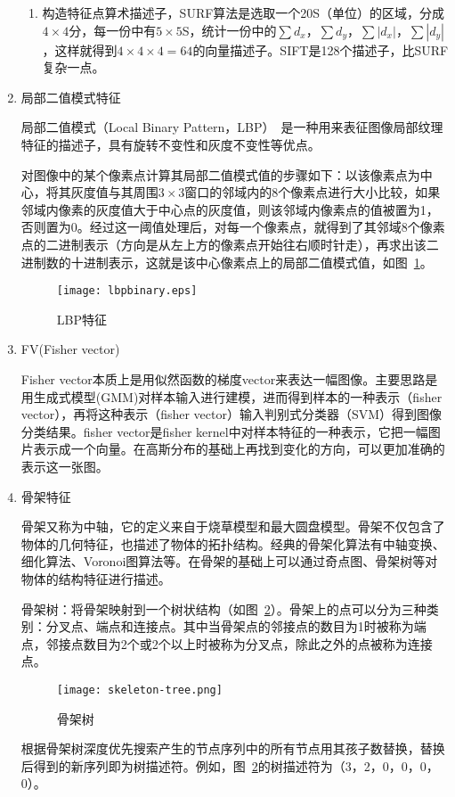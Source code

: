 \begin{enumerate}
\begin{enumerate}
\item 构造特征点算术描述子，SURF算法是选取一个20S（单位）的区域，分成$4 \times 4$分，每一份中有$5 \times 5$S，统计一份中的$\sum d_{x}$，$\sum d_{y}$，$\sum |d_{x}|$，$\sum |d_{y}|$，这样就得到$4 \times 4 \times 4 = 64$的向量描述子。SIFT是128个描述子，比SURF复杂一点。
\end{enumerate}

\item 局部二值模式特征

局部二值模式（Local Binary Pattern，LBP）~\cite{ojala1994performance}是一种用来表征图像局部纹理特征的描述子，具有旋转不变性和灰度不变性等优点。
 
 对图像中的某个像素点计算其局部二值模式值的步骤如下：以该像素点为中心，将其灰度值与其周围$3\times3$窗口的邻域内的8个像素点进行大小比较，如果邻域内像素的灰度值大于中心点的灰度值，则该邻域内像素点的值被置为1，否则置为0。经过这一阈值处理后，对每一个像素点，就得到了其邻域8个像素点的二进制表示（方向是从左上方的像素点开始往右顺时针走），再求出该二进制数的十进制表示，这就是该中心像素点上的局部二值模式值，如图~\ref{fig: lbp}。
\begin{figure}[!ht]
\centering
\texttt{[image: lbpbinary.eps]}
\caption{LBP特征}
\label{fig: lbp}
\end{figure}

\item FV(Fisher vector)
   
Fisher vector本质上是用似然函数的梯度vector来表达一幅图像。主要思路是用生成式模型(GMM)对样本输入进行建模，进而得到样本的一种表示（fisher vector），再将这种表示（fisher vector）输入判别式分类器（SVM）得到图像分类结果。fisher vector是fisher kernel中对样本特征的一种表示，它把一幅图片表示成一个向量。在高斯分布的基础上再找到变化的方向，可以更加准确的表示这一张图。

\item 骨架特征

骨架又称为中轴，它的定义来自于烧草模型和最大圆盘模型。骨架不仅包含了物体的几何特征，也描述了物体的拓扑结构。经典的骨架化算法有中轴变换、细化算法、Voronoi图算法等。在骨架的基础上可以通过奇点图、骨架树等对物体的结构特征进行描述。

骨架树：将骨架映射到一个树状结构（如图~\ref{fig: skeleton-tree}）。骨架上的点可以分为三种类别：分叉点、端点和连接点。其中当骨架点的邻接点的数目为1时被称为端点，邻接点数目为2个或2个以上时被称为分叉点，除此之外的点被称为连接点。
\begin{figure}
\centering
\texttt{[image: skeleton-tree.png]}
\caption{骨架树}
\label{fig: skeleton-tree}
\end{figure}
根据骨架树深度优先搜索产生的节点序列中的所有节点用其孩子数替换，替换后得到的新序列即为树描述符。例如，图~\ref{fig: skeleton-tree}的树描述符为（3，2，0，0，0，0）。


\end{enumerate}
